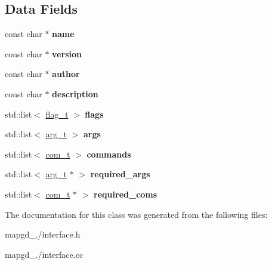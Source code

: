 \subsection*{Data Fields}
\begin{DoxyCompactItemize}
\item 
\hypertarget{classenv__t_a8a4fdbcdf5773e33d4a1553bc621e1b4}{const char $\ast$ {\bfseries name}}\label{classenv__t_a8a4fdbcdf5773e33d4a1553bc621e1b4}

\item 
\hypertarget{classenv__t_a837e459f0e0d418a976ed4e8fa6acd39}{const char $\ast$ {\bfseries version}}\label{classenv__t_a837e459f0e0d418a976ed4e8fa6acd39}

\item 
\hypertarget{classenv__t_a93b99498ee34c3e607bf2757b13443dc}{const char $\ast$ {\bfseries author}}\label{classenv__t_a93b99498ee34c3e607bf2757b13443dc}

\item 
\hypertarget{classenv__t_ae3578fa78fcac7714be35958427095c2}{const char $\ast$ {\bfseries description}}\label{classenv__t_ae3578fa78fcac7714be35958427095c2}

\item 
\hypertarget{classenv__t_a0b17ee1539e7a27fe0e5efb1ddf13af0}{std\-::list$<$ \hyperlink{classflag__t}{flag\-\_\-t} $>$ {\bfseries flags}}\label{classenv__t_a0b17ee1539e7a27fe0e5efb1ddf13af0}

\item 
\hypertarget{classenv__t_ae74e249d826b986f6af2f5450cd246df}{std\-::list$<$ \hyperlink{classarg__t}{arg\-\_\-t} $>$ {\bfseries args}}\label{classenv__t_ae74e249d826b986f6af2f5450cd246df}

\item 
\hypertarget{classenv__t_a26bd9c2ce445926975e57dbe831f4a39}{std\-::list$<$ \hyperlink{classcom__t}{com\-\_\-t} $>$ {\bfseries commands}}\label{classenv__t_a26bd9c2ce445926975e57dbe831f4a39}

\item 
\hypertarget{classenv__t_aa756e347b263bb995d2e1b469cccf4cd}{std\-::list$<$ \hyperlink{classarg__t}{arg\-\_\-t} $\ast$ $>$ {\bfseries required\-\_\-args}}\label{classenv__t_aa756e347b263bb995d2e1b469cccf4cd}

\item 
\hypertarget{classenv__t_a933addf499dd49e5ee6883c4960e1a44}{std\-::list$<$ \hyperlink{classcom__t}{com\-\_\-t} $\ast$ $>$ {\bfseries required\-\_\-coms}}\label{classenv__t_a933addf499dd49e5ee6883c4960e1a44}

\end{DoxyCompactItemize}


The documentation for this class was generated from the following files\-:\begin{DoxyCompactItemize}
\item 
mapgd\-\_./interface.\-h\item 
mapgd\-\_./interface.\-cc\end{DoxyCompactItemize}
